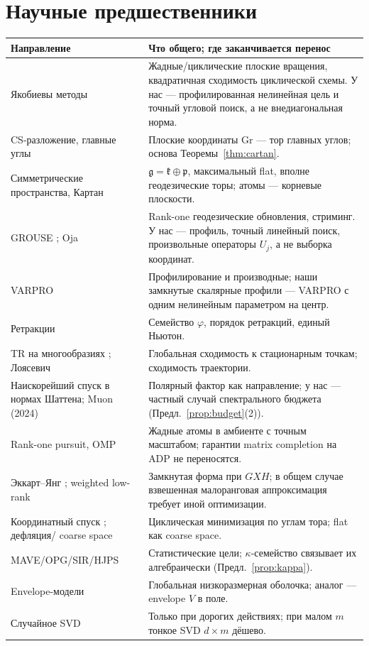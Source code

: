 \documentclass[11pt,a4paper]{article}
\newcommand{\Gr}{\mathrm{Gr}}
\theoremstyle{remark}
\begin{document}
\section{Научные предшественники}\label{sec:lit}

\begin{center}\small
\begin{tabularx}{\linewidth}{@{}p{34mm}L@{}}
\toprule
Направление & Что общего; где заканчивается перенос\\
\midrule
Якобиевы методы \cite{jacobi,schonhage,bgbm} &
Жадные/циклические плоские вращения, квадратичная сходимость циклической
схемы. У нас --- профилированная нелинейная цель и точный угловой поиск,
а не внедиагональная норма.\\
CS-разложение, главные углы \cite{gvl} &
Плоские координаты $\Gr$ --- тор главных углов; основа Теоремы~\ref{thm:cartan}.\\
Симметрические пространства, Картан \cite{helgason,eas} &
 $\mathfrak g=\mathfrak k\oplus\mathfrak p$, максимальный flat, вполне
геодезические торы; атомы --- корневые плоскости.\\
GROUSE \cite{grouse}; Oja \cite{oja} &
Rank-one геодезические обновления, стриминг. У нас --- профиль, точный
линейный поиск, произвольные операторы $U_j$, а не выборка координат.\\
VARPRO \cite{varpro,varpro2} &
Профилирование и производные; наши замкнутые скалярные профили ---
VARPRO с одним нелинейным параметром на центр.\\
Ретракции \cite{absilmalick,wenyin,ams} &
Семейство $\varphi$, порядок ретракций, единый Ньютон.\\
TR на многообразиях \cite{abg}; Лоясевич \cite{ama05} &
Глобальная сходимость к стационарным точкам; сходимость траектории.\\
Наискорейший спуск в нормах Шаттена; Muon (2024) &
Полярный фактор как направление; у нас --- частный случай спектрального
бюджета (Предл.~\ref{prop:budget}(2)).\\
Rank-one pursuit, OMP \cite{pursuit,mallat} &
Жадные атомы в амбиенте с точным масштабом; гарантии matrix completion
на ADP не переносятся.\\
Эккарт--Янг \cite{eckart}; weighted low-rank \cite{sw,mishra} &
Замкнутая форма при $GXH$; в общем случае взвешенная малоранговая
аппроксимация требует иной оптимизации.\\
Координатный спуск \cite{tseng}; дефляция/ coarse space \cite{defcg} &
Циклическая минимизация по углам тора; flat как coarse space.\\
MAVE/OPG/SIR/HJPS \cite{mave,sir,hjps} &
Статистические цели; $\kappa$-семейство связывает их алгебраически
(Предл.~\ref{prop:kappa}).\\
Envelope-модели \cite{cook} &
Глобальная низкоразмерная оболочка; аналог --- envelope $V$ в поле.\\
Случайное SVD \cite{halko} &
Только при дорогих действиях; при малом $m$ тонкое SVD $d\times m$ дёшево.\\
\bottomrule
\end{tabularx}
\end{center}
\end{document}
